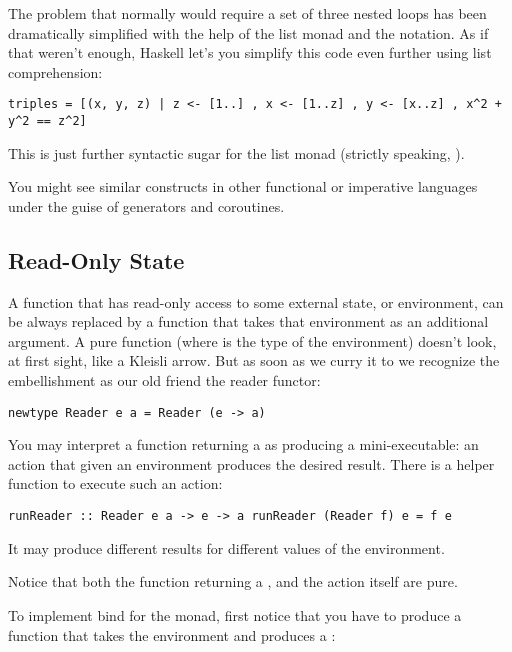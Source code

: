 The problem that normally would require a set of three nested loops has
been dramatically simplified with the help of the list monad and the
 notation. As if that weren't enough, Haskell let's you
simplify this code even further using list comprehension:

\begin{verbatim}
triples = [(x, y, z) | z <- [1..] , x <- [1..z] , y <- [x..z] , x^2 + y^2 == z^2]
\end{verbatim}

This is just further syntactic sugar for the list monad (strictly
speaking, ).

You might see similar constructs in other functional or imperative
languages under the guise of generators and coroutines.

\subsection{Read-Only State}\label{read-only-state}

A function that has read-only access to some external state, or
environment, can be always replaced by a function that takes that
environment as an additional argument. A pure function
 (where  is the type of
the environment) doesn't look, at first sight, like a Kleisli arrow. But
as soon as we curry it to
 we recognize the
embellishment as our old friend the reader functor:

\begin{verbatim}
newtype Reader e a = Reader (e -> a)
\end{verbatim}

You may interpret a function returning a  as producing a
mini-executable: an action that given an environment produces the
desired result. There is a helper function  to execute
such an action:

\begin{verbatim}
runReader :: Reader e a -> e -> a runReader (Reader f) e = f e
\end{verbatim}

It may produce different results for different values of the
environment.

Notice that both the function returning a , and the
 action itself are pure.

To implement bind for the  monad, first notice that you
have to produce a function that takes the environment  and
produces a :


